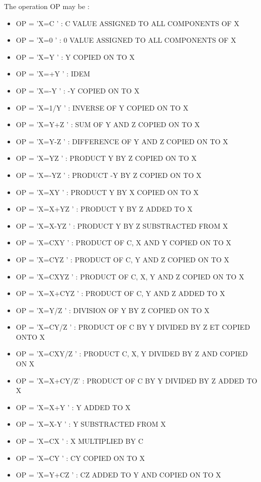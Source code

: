 The operation OP may be :
\begin{itemize}
  \item OP = 'X=C     ' :  C VALUE ASSIGNED TO ALL COMPONENTS OF X
  \item OP = 'X=0     ' :  0 VALUE ASSIGNED TO ALL COMPONENTS OF X
  \item OP = 'X=Y     ' :  Y COPIED ON TO X
  \item OP = 'X=+Y    ' :  IDEM
  \item OP = 'X=-Y    ' : -Y COPIED ON TO X
  \item OP = 'X=1/Y   ' :  INVERSE OF Y COPIED ON TO X
  \item OP = 'X=Y+Z   ' :  SUM OF Y AND Z COPIED ON TO X
  \item OP = 'X=Y-Z   ' :  DIFFERENCE OF Y AND Z COPIED ON TO X
  \item OP = 'X=YZ    ' :  PRODUCT Y BY Z COPIED ON TO X
  \item OP = 'X=-YZ   ' :  PRODUCT -Y BY Z COPIED ON TO X
  \item OP = 'X=XY    ' :  PRODUCT Y BY X COPIED ON TO X
  \item OP = 'X=X+YZ  ' :  PRODUCT Y BY Z ADDED TO X
  \item OP = 'X=X-YZ  ' :  PRODUCT Y BY Z SUBSTRACTED FROM X
  \item OP = 'X=CXY   ' :  PRODUCT OF C, X AND Y COPIED ON TO X
  \item OP = 'X=CYZ   ' :  PRODUCT OF C, Y AND Z COPIED ON TO X
  \item OP = 'X=CXYZ  ' :  PRODUCT OF C, X, Y AND Z COPIED ON TO X
  \item OP = 'X=X+CYZ ' :  PRODUCT OF C, Y AND Z ADDED TO X
  \item OP = 'X=Y/Z   ' :  DIVISION OF Y BY Z COPIED ON TO X
  \item OP = 'X=CY/Z  ' :  PRODUCT OF C BY Y DIVIDED BY Z ET COPIED ONTO X
  \item OP = 'X=CXY/Z ' :  PRODUCT C, X, Y DIVIDED BY Z AND COPIED ON X
  \item OP = 'X=X+CY/Z' :  PRODUCT OF C BY Y DIVIDED BY Z ADDED TO X
  \item OP = 'X=X+Y   ' :  Y ADDED TO X
  \item OP = 'X=X-Y   ' :  Y SUBSTRACTED FROM X
  \item OP = 'X=CX    ' :  X MULTIPLIED BY C
  \item OP = 'X=CY    ' :  CY COPIED ON TO X
  \item OP = 'X=Y+CZ  ' :  CZ ADDED TO Y AND COPIED ON TO X

\end{itemize}
